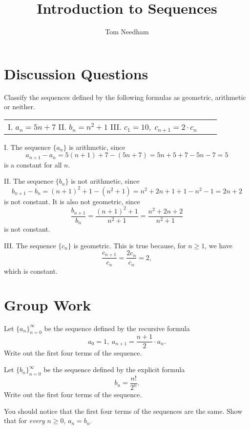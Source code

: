 \documentclass[]{ximera}
\author{Tom Needham}
\title[]{Introduction to Sequences}
\begin{document}
\begin{abstract}
\end{abstract}
\maketitle

\vspace{-0.4in}

\section{Discussion Questions}

\begin{problem}
Classify the sequences defined by the following formulas as geometric, arithmetic or neither.
\begin{center}
\begin{tabular}{lll}
I. $a_n = 5n + 7$ \hspace{.4in} II. $b_n = n^2 + 1$ \hspace{.4in} III. $c_1 = 10, \; c_{n+1}= 2\cdot c_n$
\end{tabular}
\end{center}
\end{problem}

\begin{freeResponse}
I. The sequence $\{a_n\}$ is arithmetic, since 
$$
a_{n+1}-a_n = 5(n+1)+7-(5n+7) = 5n + 5 + 7 - 5n - 7 = 5
$$
is a constant for all $n$.

II. The sequence $\{b_n\}$ is not arithmetic, since
$$
b_{n+1}-b_n = (n+1)^2 + 1 - (n^2+1) = n^2 + 2n + 1 + 1 - n^2 - 1 = 2n + 2
$$
is not constant. It is also not geometric, since
$$
\frac{b_{n+1}}{b_n} = \frac{(n+1)^2 + 1}{n^2 + 1} = \frac{n^2+2n + 2}{n^2 + 1}
$$
is not constant.

III. The sequence $\{c_n\}$ is geometric. This is true  because, for $n\geq 1$, we have
$$
\frac{c_{n+1}}{c_n} = \frac{2 c_n}{c_n} = 2,
$$
which is constant.
\end{freeResponse}


\section{Group Work}

\begin{problem}
Let $\{a_n\}_{n=0}^\infty$ be the sequence defined by the recursive formula
$$
a_0 = 1, \; a_{n+1}=\frac{n+1}{2} \cdot a_n.
$$
Write out the first four terms of the sequence.

Let $\{b_n\}_{n=0}^\infty$ be the sequence defined by the explicit formula 
$$
b_n = \frac{n!}{2^n}.
$$
Write out the first four terms of the sequence.

You should notice that the first four terms of the sequences are the same. Show that for \emph{every} $n \geq 0$, $a_n = b_n$. 
\end{problem}
\end{document}
